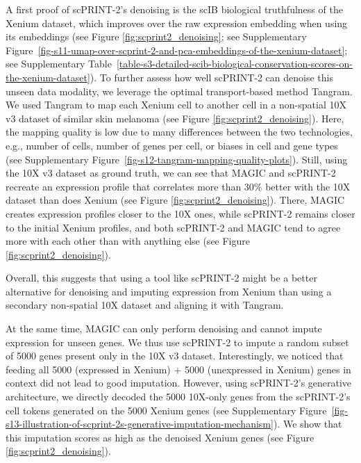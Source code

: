 A first proof of \gls{scPRINT}-2's denoising is the \gls{scIB} biological
truthfulness of the Xenium dataset, which improves over the raw
expression embedding when using its embeddings (see Figure \ref{fig:scprint2_denoising}; see
Supplementary Figure~\ref{fig-s11-umap-over-scprint-2-and-pca-embeddings-of-the-xenium-dataset}; see Supplementary Table~\ref{table-s3-detailed-scib-biological-conservation-scores-on-the-xenium-dataset}). To further assess how well
\gls{scPRINT}-2 can denoise this unseen data modality, we leverage the optimal
transport-based method Tangram\citep{biancalaniDeepLearningAlignment2021}. We used Tangram to
map each Xenium cell to another cell in a non-spatial 10X v3 dataset of
similar skin melanoma\citep{zhangSinglecellAnalysisReveals2022} (see Figure \ref{fig:scprint2_denoising}). Here, the
mapping quality is low due to many differences between the two
technologies, e.g., number of cells, number of genes per cell, or biases
in cell and gene types (see Supplementary Figure~\ref{fig-s12-tangram-mapping-quality-plots}). Still, using the 10X v3
dataset as ground truth, we can see that MAGIC and \gls{scPRINT}-2 recreate an
expression profile that correlates more than 30\% better with the 10X
dataset than does Xenium (see Figure \ref{fig:scprint2_denoising}). There, MAGIC creates
expression profiles closer to the 10X ones, while \gls{scPRINT}-2 remains
closer to the initial Xenium profiles, and both \gls{scPRINT}-2 and MAGIC tend
to agree more with each other than with anything else (see Figure \ref{fig:scprint2_denoising}).

Overall, this suggests that using a tool like \gls{scPRINT}-2 might be a
better alternative for denoising and imputing expression from Xenium
than using a secondary non-spatial 10X dataset and aligning it with
Tangram.

At the same time, MAGIC can only perform denoising and cannot impute
expression for unseen genes. We thus use \gls{scPRINT}-2 to impute a random
subset of 5000 genes present only in the 10X v3 dataset. Interestingly,
we noticed that feeding all 5000 (expressed in Xenium) + 5000
(unexpressed in Xenium) genes in context did not lead to good
imputation. However, using \gls{scPRINT}-2's generative architecture, we
directly decoded the 5000 10X-only genes from the \gls{scPRINT}-2's cell
tokens generated on the 5000 Xenium genes (see Supplementary Figure~\ref{fig-s13-illustration-of-scprint-2s-generative-imputation-mechanism}). We
show that this imputation scores as high as the denoised Xenium genes
(see Figure \ref{fig:scprint2_denoising}).

